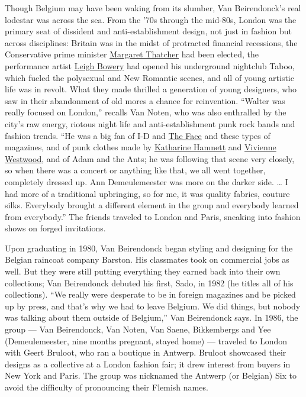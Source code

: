 Though Belgium may have been waking from its slumber, Van Beirendonck's
real lodestar was across the sea. From the '70s through the mid-80s,
London was the primary seat of dissident and anti-establishment design,
not just in fashion but across disciplines: Britain was in the midst of
protracted financial recessions, the Conservative prime minister
\href{https://www.nytimes3xbfgragh.onion/topic/person/margaret-thatcher}{Margaret
Thatcher} had been elected, the performance artist
\href{https://www.nytimes3xbfgragh.onion/1995/01/07/obituaries/leigh-bowery-33-artist-and-model.html}{Leigh
Bowery} had opened his underground nightclub Taboo, which fueled the
polysexual and New Romantic scenes, and all of young artistic life was
in revolt. What they made thrilled a generation of young designers, who
saw in their abandonment of old mores a chance for reinvention. ``Walter
was really focused on London,'' recalls Van Noten, who was also
enthralled by the city's raw energy, riotous night life and
anti-establishment punk rock bands and fashion trends. ``He was a big
fan of I-D and
\href{https://www.nytimes3xbfgragh.onion/2019/03/26/style/the-face-magazine.html}{The
Face} and these types of magazines, and of punk clothes made by
\href{https://katharinehamnett.com/}{Katharine Hamnett} and
\href{https://www.nytimes3xbfgragh.onion/topic/person/vivienne-westwood}{Vivienne
Westwood}, and of Adam and the Ants; he was following that scene very
closely, so when there was a concert or anything like that, we all went
together, completely dressed up. Ann Demeulemeester was more on the
darker side. \ldots{} I had more of a traditional upbringing, so for me,
it was quality fabrics, couture silks. Everybody brought a different
element in the group and everybody learned from everybody.'' The friends
traveled to London and Paris, sneaking into fashion shows on forged
invitations.

Upon graduating in 1980, Van Beirendonck began styling and designing for
the Belgian raincoat company Barston. His classmates took on commercial
jobs as well. But they were still putting everything they earned back
into their own collections; Van Beirendonck debuted his first, Sado, in
1982 (he titles all of his collections). ``We really were desperate to
be in foreign magazines and be picked up by press, and that's why we had
to leave Belgium. We did things, but nobody was talking about them
outside of Belgium,'' Van Beirendonck says. In 1986, the group --- Van
Beirendonck, Van Noten, Van Saene, Bikkembergs and Yee (Demeulemeester,
nine months pregnant, stayed home) --- traveled to London with Geert
Bruloot, who ran a boutique in Antwerp. Bruloot showcased their designs
as a collective at a London fashion fair; it drew interest from buyers
in New York and Paris. The group was nicknamed the Antwerp (or Belgian)
Six to avoid the difficulty of pronouncing their Flemish names.

